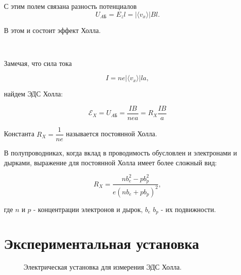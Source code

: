 \documentclass[11pt]{article}
\begin{document}
    С этим полем связана разность потенциалов $$U_{AБ}=E_{z}l=| \langle {v_{x}} \rangle | Bl.$$
    
    В этом и состоит эффект Холла.
    
    \
    
    Замечая, что сила тока
    
    $$ I=ne| \langle {v_{x}} \rangle |la,$$
    
    найдем ЭДС Холла:
    
\begin{equation}\label{Rx}
    \mathscr{E}_{X}=U_{AБ}=\dfrac{IB}{nea}=R_{X}\dfrac{IB}{a}
\end{equation}
    
    Константа $R_{X}=\dfrac{1}{ne}$ называется постоянной Холла.
    
    В полупроводниках, когда вклад в проводимость обусловлен и электронами и дырками, выражение для постоянной Холла имеет более сложный вид:
    
    $$R_{X}=\dfrac{nb^{2}_{e}-pb^{2}_{p}}{e(nb_{e}+pb_{p})^{2}},$$
    
    где $n$ и $p$ - концентрации электронов и дырок, $b_{e}$ $b_{p}$ - их подвижности.
    




\section{Экспериментальная установка}
    \begin{figure}[H]
    \caption{Электрическая установка для измерения ЭДС Холла.}
    \label{pic:3}
    \end{figure}
\newpage
\end{document}
